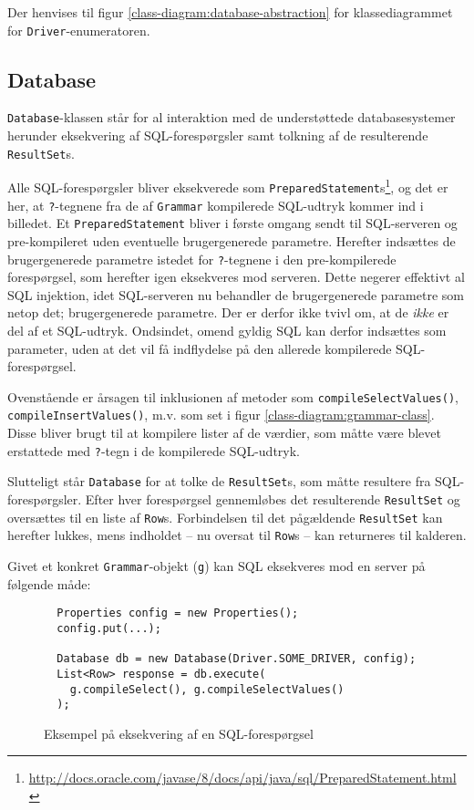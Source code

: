 Der henvises til figur \ref{class-diagram:database-abstraction} for klassediagrammet for \texttt{Driver}-enumeratoren.

\subsection{Database}

\texttt{Database}-klassen står for al interaktion med de understøttede databasesystemer herunder eksekvering af SQL-forespørgsler samt tolkning af de resulterende \texttt{ResultSet}s.

Alle SQL-forespørgsler bliver eksekverede som \texttt{Prepared\-Statement}s\footnote{\url{http://docs.oracle.com/javase/8/docs/api/java/sql/PreparedStatement.html}}, og det er her, at \texttt{?}-tegnene fra de af \texttt{Grammar} kompilerede SQL-udtryk kommer ind i billedet. Et \texttt{Prepared\-Statement} bliver i første omgang sendt til SQL-serveren og pre-kompileret uden eventuelle brugergenerede parametre. Herefter indsættes de brugergenerede parametre istedet for \texttt{?}-tegnene i den pre-kompilerede forespørgsel, som herefter igen eksekveres mod serveren. Dette negerer effektivt al SQL injektion, idet SQL-serveren nu behandler de brugergenerede parametre som netop det; brugergenerede parametre. Der er derfor ikke tvivl om, at de \textit{ikke} er del af et SQL-udtryk. Ondsindet, omend gyldig SQL kan derfor indsættes som parameter, uden at det vil få indflydelse på den allerede kompilerede SQL-forespørgsel.

Ovenstående er årsagen til inklusionen af metoder som \texttt{compile\-Select\-Values()}, \texttt{compile\-Insert\-Values()}, m.v. som set i figur \ref{class-diagram:grammar-class}. Disse bliver brugt til at kompilere lister af de værdier, som måtte være blevet erstattede med \texttt{?}-tegn i de kompilerede SQL-udtryk.

Slutteligt står \texttt{Database} for at tolke de \texttt{Result\-Set}s, som måtte resultere fra SQL-forespørgsler. Efter hver forespørgsel gennemløbes det resulterende \texttt{Result\-Set} og oversættes til en liste af \texttt{Row}s. Forbindelsen til det pågældende \texttt{Result\-Set} kan herefter lukkes, mens indholdet – nu oversat til \texttt{Row}s – kan returneres til kalderen.

Givet et konkret \texttt{Grammar}-objekt (\texttt{g}) kan SQL eksekveres mod en server på følgende måde:

\begin{figure}[h]
  \begin{verbatim}
  Properties config = new Properties();
  config.put(...);
  
  Database db = new Database(Driver.SOME_DRIVER, config);
  List<Row> response = db.execute(
    g.compileSelect(), g.compileSelectValues()
  );
  \end{verbatim}
  \caption{Eksempel på eksekvering af en SQL-forespørgsel}
  \label{code-example:sql-execution}
\end{figure}

